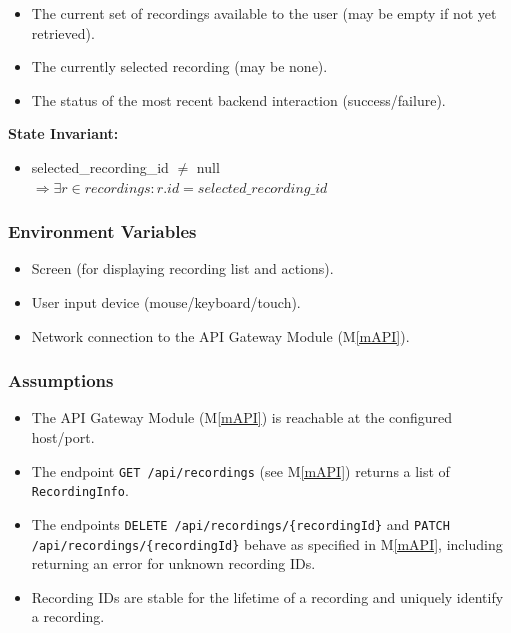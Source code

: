 \documentclass[12pt, titlepage]{article}
\newcommand{\mref}[1]{M\ref{#1}}
\begin{document}
\begin{itemize}
  \item The current set of recordings available to the user (may be empty if not yet
        retrieved).
  \item The currently selected recording (may be none).
  \item The status of the most recent backend interaction (success/failure).
\end{itemize}

\noindent \textbf{State Invariant:}
\begin{itemize}
  \item selected\_recording\_id $\neq$ null $\Rightarrow \exists r \in recordings: r.id
          = selected\_recording\_id$
\end{itemize}

\subsubsection{Environment Variables}

\begin{itemize}
  \item Screen (for displaying recording list and actions).
  \item User input device (mouse/keyboard/touch).
  \item Network connection to the API Gateway Module (\mref{mAPI}).
\end{itemize}

\subsubsection{Assumptions}

\begin{itemize}
  \item The API Gateway Module (\mref{mAPI}) is reachable at the configured host/port.
  \item The endpoint \texttt{GET /api/recordings} (see \mref{mAPI}) returns a list of
        \texttt{RecordingInfo}.
  \item The endpoints \texttt{DELETE /api/recordings/\{recordingId\}} and \texttt{PATCH
          /api/recordings/\{recordingId\}} behave as specified in \mref{mAPI}, including
        returning an error for unknown recording IDs.
  \item Recording IDs are stable for the lifetime of a recording and uniquely identify
        a recording.
\end{itemize}
\end{document}
